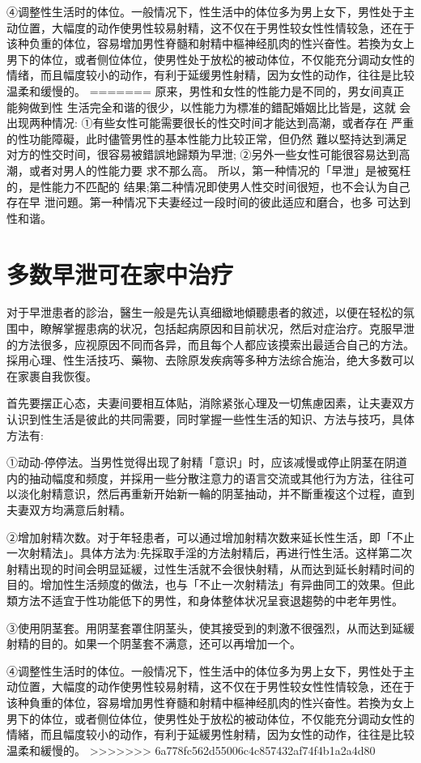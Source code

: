 \documentclass[12pt,UTF8]{ctexbook}
\begin{document}
④调整性生活时的体位。一般情况下，性生活中的体位多为男上女下，男性处于主动位置，大幅度的动作使男性较易射精，这不仅在于男性较女性性情较急，还在于该种负重的体位，容易增加男性脊髓和射精中樞神经肌肉的性兴奋性。若換为女上男下的体位，或者侧位体位，使男性处于放松的被动体位，不仅能充分调动女性的情绪，而且幅度较小的动作，有利于延缓男性射精，因为女性的动作，往往是比较温柔和缓慢的。
=======
原来，男性和女性的性能力是不同的，男女间真正能夠做到性
生活完全和谐的很少，以性能力为標准的錯配婚姻比比皆是，这就
会出现两种情况:
①有些女性可能需要很长的性交时间才能达到高潮，或者存在
严重的性功能障礙，此时儘管男性的基本性能力比较正常，但仍然
難以堅持达到满足对方的性交时间，很容易被錯誤地歸類为早泄;
②另外一些女性可能很容易达到高潮，或者对男人的性能力要
求不那么高。
所以，第一种情况的「早泄」是被冤枉的，是性能力不匹配的
结果;第二种情况即使男人性交时间很短，也不会认为自己存在早
泄问題。第一种情况下夫妻经过一段时间的彼此适应和磨合，也多
可达到性和谐。

\section{多数早泄可在家中治疗}

对于早泄患者的診治，醫生一般是先认真细緻地傾聽患者的敘述，以便在轻松的氛围中，瞭解掌握患病的状况，包括起病原因和目前状况，然后对症治疗。克服早泄的方法很多，应视原因不同而各异，而且每个人都应该摸索出最适合自己的方法。採用心理、性生活技巧、藥物、去除原发疾病等多种方法综合施治，绝大多数可以在家裹自我恢復。

首先要摆正心态，夫妻间要相互体贴，消除紧张心理及一切焦慮因素，让夫妻双方认识到性生活是彼此的共同需要，同时掌握一些性生活的知识、方法与技巧，具体方法有:

①动动-停停法。当男性觉得出现了射精「意识」时，应该减慢或停止阴茎在阴道内的抽动幅度和频度，并採用一些分散注意力的语言交流或其他行为方法，往往可以淡化射精意识，然后再重新开始新一輪的阴茎抽动，并不斷重複这个过程，直到夫妻双方均满意后射精。

②增加射精次数。对于年轻患者，可以通过增加射精次数来延长性生活，即「不止一次射精法」。具体方法为:先採取手淫的方法射精后，再进行性生活。这样第二次射精出现的时间会明显延緩，过性生活就不会很快射精，从而达到延长射精时间的目的。增加性生活频度的做法，也与「不止一次射精法」有异曲同工的效果。但此類方法不适宜于性功能低下的男性，和身体整体状况呈衰退趨勢的中老年男性。

③使用阴茎套。用阴茎套罩住阴茎头，使其接受到的刺激不很强烈，从而达到延緩射精的目的。如果一个阴茎套不满意，还可以再增加一个。

④调整性生活时的体位。一般情况下，性生活中的体位多为男上女下，男性处于主动位置，大幅度的动作使男性较易射精，这不仅在于男性较女性性情较急，还在于该种負重的体位，容易增加男性脊髓和射精中樞神经肌肉的性兴奋性。若換为女上男下的体位，或者侧位体位，使男性处于放松的被动体位，不仅能充分调动女性的情緒，而且幅度较小的动作，有利于延緩男性射精，因为女性的动作，往往是比较温柔和緩慢的。
>>>>>>> 6a778fc562d55006c4c857432af74f4b1a2a4d80
\end{document}
